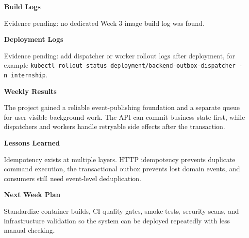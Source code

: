 \begin{Shaded}
\begin{Highlighting}[]
 
 
\end{Highlighting}
\end{Shaded}

\vspace{0.5em}\noindent\textbf{Build Logs}\par

Evidence pending: no dedicated Week 3 image build log was found.

\vspace{0.5em}\noindent\textbf{Deployment Logs}\par

Evidence pending: add dispatcher or worker rollout logs after
deployment, for example
\texttt{kubectl\ rollout\ status\ deployment/\allowbreak{}backend-\allowbreak{}outbox-\allowbreak{}dispatcher\ -n\ internship}.

\vspace{0.5em}\noindent\textbf{Weekly Results}\par

The project gained a reliable event-publishing foundation and a separate
queue for user-visible background work. The API can commit business
state first, while dispatchers and workers handle retryable side effects
after the transaction.

\vspace{0.5em}\noindent\textbf{Lessons Learned}\par

Idempotency exists at multiple layers. HTTP idempotency prevents
duplicate command execution, the transactional outbox prevents lost
domain events, and consumers still need event-level deduplication.

\vspace{0.5em}\noindent\textbf{Next Week Plan}\par

Standardize container builds, CI quality gates, smoke tests, security
scans, and infrastructure validation so the system can be deployed
repeatedly with less manual checking.

